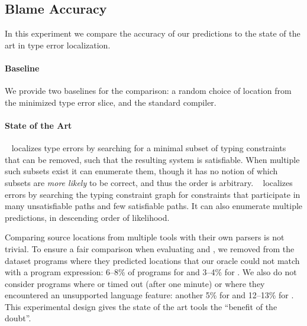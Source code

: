 \subsection{Blame Accuracy}
\label{sec:quantitative}

In this experiment we compare the accuracy of our predictions to the
state of the art in type error localization.

\paragraph{Baseline}
We provide two baselines for the comparison: a random choice of location
from the minimized type error slice, and the standard \ocaml compiler.

\paragraph{State of the Art}
\mycroft~\citep{Loncaric2016-uk} localizes type errors by searching for
a minimal subset of typing constraints that can be removed, such that
the resulting system is satisfiable.
%
When multiple such subsets exist it can enumerate them, though it has no
notion of which subsets are \emph{more likely} to be correct, and thus
the order is arbitrary.
%
\sherrloc~\citep{Zhang2014-lv} localizes errors by searching the typing
constraint graph for constraints that participate in many unsatisfiable
paths and few satisfiable paths.
%
It can also enumerate multiple predictions, in descending order of
likelihood.

Comparing source locations from multiple tools with their own parsers is
not trivial.
%
To ensure a fair comparison when evaluating \mycroft and
\sherrloc, we removed from the dataset programs where they predicted
locations that our oracle could not match with a program expression:
6--8\% of programs for \mycroft and 3--4\% for \sherrloc.
%
We also do not consider programs where \mycroft or \sherrloc timed out
(after one minute) or where they encountered an unsupported language
feature: another 5\% for \mycroft and 12--13\% for \sherrloc. This
experimental design gives the state of the art tools the ``benefit of the
doubt''.


